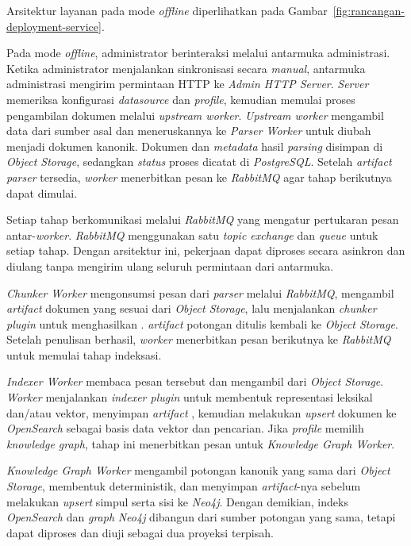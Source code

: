 \noindent Arsitektur layanan pada mode \emph{offline} diperlihatkan pada Gambar~\ref{fig:rancangan-deployment-service}.

Pada mode \emph{offline}, administrator berinteraksi melalui antarmuka administrasi.
Ketika administrator menjalankan sinkronisasi secara \emph{manual}, antarmuka administrasi
mengirim permintaan HTTP ke \emph{Admin HTTP Server}. \emph{Server} memeriksa konfigurasi
\emph{datasource} dan \emph{profile}, kemudian memulai proses pengambilan dokumen
melalui \emph{upstream worker}. \emph{Upstream worker} mengambil data dari sumber
asal dan meneruskannya ke \emph{Parser Worker} untuk diubah menjadi dokumen
kanonik. Dokumen dan \emph{metadata} hasil \emph{parsing} disimpan di \emph{Object Storage},
sedangkan \emph{status} proses dicatat di \emph{PostgreSQL}. Setelah \emph{artifact} \emph{parser} tersedia,
\emph{worker} menerbitkan pesan  ke \emph{RabbitMQ} agar tahap berikutnya
dapat dimulai.

Setiap tahap berkomunikasi melalui \emph{RabbitMQ} yang mengatur pertukaran pesan
antar-\emph{worker}. \emph{RabbitMQ} menggunakan satu \emph{topic exchange} dan \emph{queue}
untuk setiap tahap. Dengan arsitektur ini, pekerjaan dapat diproses secara
asinkron dan diulang tanpa mengirim ulang seluruh permintaan dari antarmuka.

\emph{Chunker Worker} mengonsumsi pesan dari \emph{parser} melalui \emph{RabbitMQ}, mengambil
\emph{artifact} dokumen yang sesuai dari \emph{Object Storage}, lalu menjalankan \emph{chunker
plugin} untuk menghasilkan . \emph{artifact} potongan ditulis kembali
ke \emph{Object Storage}. Setelah penulisan berhasil, \emph{worker} menerbitkan pesan
berikutnya ke \emph{RabbitMQ} untuk memulai tahap indeksasi.

\emph{Indexer Worker} membaca pesan tersebut dan mengambil 
dari \emph{Object Storage}. \emph{Worker} menjalankan \emph{indexer plugin} untuk
membentuk representasi leksikal dan/atau vektor, menyimpan \emph{artifact}
, kemudian melakukan \emph{upsert} dokumen ke \emph{OpenSearch}
sebagai basis data vektor dan pencarian. Jika \emph{profile} memilih \emph{knowledge graph},
tahap ini menerbitkan pesan untuk \emph{Knowledge Graph Worker}.

\emph{Knowledge Graph Worker} mengambil potongan kanonik yang sama dari
\emph{Object Storage}, membentuk  deterministik, dan
menyimpan \emph{artifact}-nya sebelum melakukan \emph{upsert} simpul serta sisi ke \emph{Neo4j}.
Dengan demikian, indeks \emph{OpenSearch} dan \emph{graph} \emph{Neo4j} dibangun dari sumber potongan
yang sama, tetapi dapat diproses dan diuji sebagai dua proyeksi terpisah.

